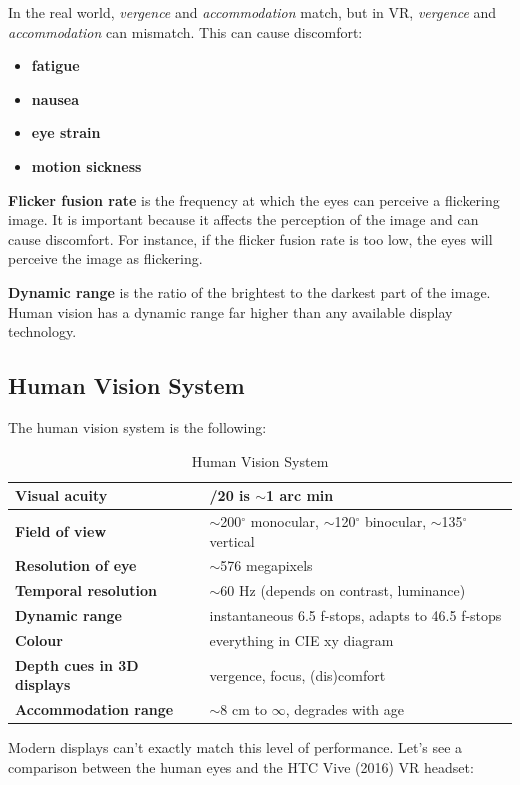 \documentclass[11pt,a4paper]{article}
\theoremstyle{definition}
\theoremstyle{plain}
\theoremstyle{remark}
\begin{document}
\begin{tcolorbox}[colback=red!5!white,colframe=red!75!black,title=\textbf{Vergence-Accommodation Mismatch in VR}]
In the real world, \textit{vergence} and \textit{accommodation} match, but
in VR, \textit{vergence} and \textit{accommodation} can mismatch.
This can cause discomfort:
\begin{itemize}
    \item \textbf{fatigue}
    \item \textbf{nausea}
    \item \textbf{eye strain}
    \item \textbf{motion sickness}
\end{itemize}
\textbf{Flicker fusion rate} is the frequency at which the eyes can perceive a flickering image.
It is important because it affects the perception of the image and can cause discomfort.
For instance, if the flicker fusion rate is too low, the eyes will perceive the image as flickering.

\textbf{Dynamic range} is the ratio of the brightest to the darkest part of the image.
Human vision has a dynamic range far higher than any available display technology.
\end{tcolorbox}


\subsection{Human Vision System}
The human vision system is the following:

\begin{table}[H]
    \centering
    \begin{tabular}{|l|>{\raggedright\arraybackslash}p{6.5cm}|}
    \hline
    \textbf{Visual acuity} & 20/20 is $\sim$1 arc min \\
    \hline
    \textbf{Field of view} & $\sim$200$^\circ$ monocular, $\sim$120$^\circ$ binocular, $\sim$135$^\circ$ vertical \\
    \hline
    \textbf{Resolution of eye} & $\sim$576 megapixels \\
    \hline
    \textbf{Temporal resolution} & $\sim$60 Hz (depends on contrast, luminance) \\
    \hline
    \textbf{Dynamic range} & instantaneous 6.5 f-stops, adapts to 46.5 f-stops \\
    \hline
    \textbf{Colour} & everything in CIE xy diagram \\
    \hline
    \textbf{Depth cues in 3D displays} & vergence, focus, (dis)comfort \\
    \hline
    \textbf{Accommodation range} & $\sim$8 cm to $\infty$, degrades with age \\
    \hline
    \end{tabular}
    \caption{Human Vision System}
\end{table}
Modern displays can't exactly match this level of performance. 
Let's see a comparison between the human eyes and the HTC Vive (2016) VR headset:
\end{document}
